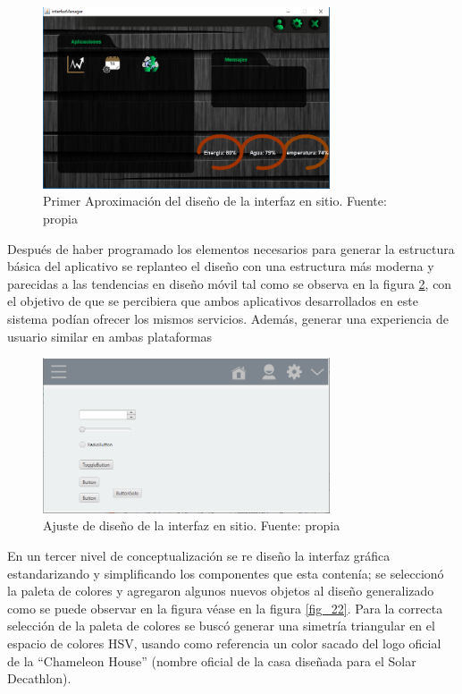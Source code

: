 \begin{figure}[htbp]
	\centerline{\includegraphics[width=8.5cm]{./figuras/houseManager23.png}}
	\caption{Primer Aproximación del diseño de la interfaz en sitio. Fuente: propia}
	\label{fig_5}
\end{figure}

Después de haber programado los elementos necesarios para generar la estructura básica del aplicativo se replanteo el diseño con una estructura más moderna y parecidas a las tendencias en diseño móvil tal como se observa en la figura \ref{fig_21}, con el objetivo de que se percibiera que ambos aplicativos desarrollados en este sistema podían ofrecer los mismos servicios. Además, generar una experiencia de usuario similar en ambas plataformas

\begin{figure}[htbp]
	\centerline{\includegraphics[width=8.5cm]{./figuras/house_manager_version_2.png}}
	\caption{Ajuste de diseño de la interfaz en sitio. Fuente: propia}
	\label{fig_21}
\end{figure}

En un tercer nivel de conceptualización se re diseño la interfaz gráfica estandarizando y simplificando los componentes que esta contenía; se seleccionó la paleta de colores y agregaron algunos nuevos objetos al diseño generalizado como se puede observar en la figura véase en la figura \ref{fig_22}. Para la correcta selección de la paleta de colores se buscó generar una simetría triangular en el espacio de colores HSV, usando como referencia un color sacado del logo oficial de la ``Chameleon House'' (nombre oficial de la casa diseñada para el Solar Decathlon). 


